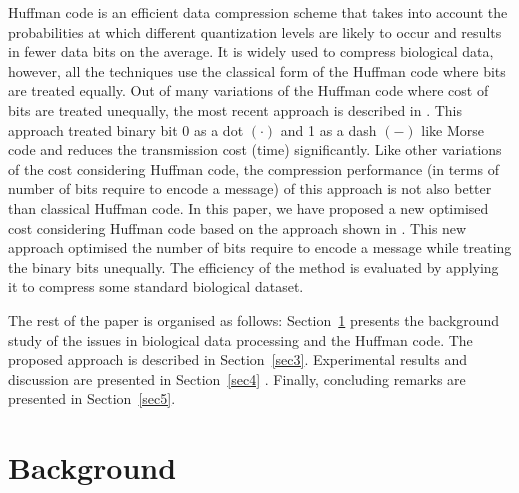 \documentclass[preprint,12pt]{elsarticle}
\begin{document}
Huffman code is an efficient data compression scheme that takes into account the probabilities at which different quantization levels are likely to occur and results in fewer data bits on the average. It is widely used to compress biological data, however, all the techniques use the classical form of the Huffman code where bits are treated equally. Out of many variations of the Huffman code where cost of bits are treated unequally, the most recent approach is described in \cite{Kab14}. This approach treated binary bit 0 as a dot $\left(\cdot\right)$ and 1 as a dash $\left(-\right)$ like Morse code and reduces the transmission cost (time) significantly. Like other variations of the cost considering Huffman code, the compression performance (in terms of number of bits require to encode a message) of this approach is not also better than classical Huffman code. In this paper, we have proposed a new optimised cost considering Huffman code based on the approach shown in \cite{Kab14}. This new approach optimised the number of bits require to encode a message while treating the binary bits unequally. The efficiency of the method is evaluated by applying it to compress some standard biological dataset.         

The rest of the paper is organised as follows: Section~\ref{sec2} presents the background study of the issues in biological data processing and the Huffman code. The proposed approach is described in Section~\ref{sec3}. Experimental results and discussion are presented in Section~\ref{sec4} . Finally, concluding remarks are presented in Section~\ref{sec5}.



\section{Background}
\label{sec2}
\end{document}

